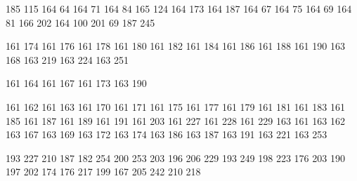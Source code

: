  185 115
 164  64
 164  71
 164  84
 165 124
 164 173
 164 187
 164  67
 164  75
 164  69
 164  81
 166 202
 164 100
 201  69
 187 245

\stopencoding

\startencoding[gbk]

 161 174
 161 176
 161 178
 161 180
 161 182
 161 184
 161 186
 161 188
 161 190
 163 168
 163 219
 163 224
 163 251

 161 164
 161 167
 161 173
 163 190

 161 162
 161 163
 161 170
 161 171
 161 175
 161 177
 161 179
 161 181
 161 183
 161 185
 161 187
 161 189
 161 191
 161 203
 161 227
 161 228
 161 229
 163 161
 163 162
 163 167
 163 169
 163 172
 163 174
 163 186
 163 187
 163 191
 163 221
 163 253

 193 227
 210 187
 182 254
 200 253
 203 196
 206 229
 193 249
 198 223
 176 203
 190 197
 202 174
 176 217
 199 167
 205 242
 210 218

\stopencoding

\endinput 
